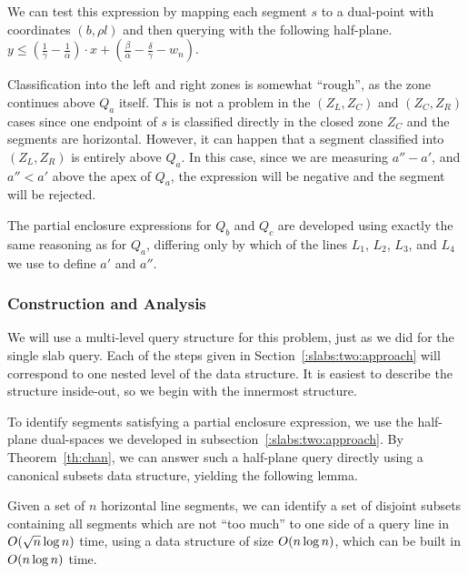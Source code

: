 We can test this expression by mapping each segment $s$ to a 
dual-point with coordinates $(b, \rho l)$ and then querying with the following 
half-plane.
$
y \leq \left ( \frac{1}{\gamma} - \frac{1}{\alpha} \right ) \cdot x + \left ( 
\frac{\beta}{\alpha} - \frac{\delta}{\gamma} - w_n \right ).
$

Classification into the left and right zones is somewhat ``rough'', as 
the zone continues above $Q_a$ itself. 
This is not a problem in the $(Z_L, Z_C)$ and $(Z_C, Z_R)$ cases since one 
endpoint of $s$ is classified directly in the closed zone $Z_C$ and the segments 
are horizontal.
However, it can happen that a segment classified into $(Z_L, Z_R)$ is entirely 
above $Q_a$. 
In this case, since we are measuring $a'' - a'$, and $a'' < a'$ above the apex 
of $Q_a$, the expression will be negative and the segment will be rejected.

The partial enclosure expressions for $Q_b$ and $Q_c$ are developed using 
exactly the same reasoning as for $Q_a$, differing only by which of the lines 
$L_1$, $L_2$, $L_3$, and $L_4$ we use to define $a'$ and $a''$.


\subsubsection{Construction and Analysis}
\label{:slabs:two:analysis}

We will use a multi-level query structure for this problem, just as we did for 
the single slab query.
Each of the steps given in Section~\ref{:slabs:two:approach} will correspond to 
one nested level of the data structure.
It is easiest to describe the structure inside-out, so we begin with the 
innermost structure.

To identify segments satisfying a partial enclosure expression, we use the 
half-plane dual-spaces we developed in subsection~\ref{:slabs:two:approach}. 
By Theorem~\ref{th:chan}, we can answer such a half-plane query directly using a 
canonical subsets data structure, yielding the following lemma.

\begin{lemma}
\label{lem:slabs:two:step1}
Given a set of $n$ horizontal line segments, we can identify a set of disjoint 
subsets containing all segments which are not ``too much'' to one side of a 
query line in $O\!\left(\sqrt{n}\log{n}\right)$ time, using a data structure of size 
$O\!\left(n\log{n}\right)$, which can be built in $O\!\left(n\log{n}\right)$ time.
\end{lemma}

